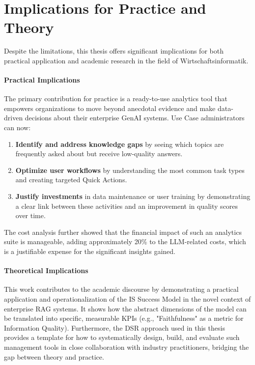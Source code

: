 \documentclass[
	english,
	ruledheaders=section,%
	class=report,%
	thesis={type=bachelor},%
	accentcolor=1b,%
	custommargins=true,%
	marginpar=false,%
	parskip=half-,%
	fontsize=11pt,%
	DIV=14,
]{tudapub}
\begin{document}
\section{Implications for Practice and Theory}
Despite the limitations, this thesis offers significant implications for both practical application and academic research in the field of Wirtschaftsinformatik.

\paragraph{Practical Implications} The primary contribution for practice is a ready-to-use analytics tool that empowers organizations to move beyond anecdotal evidence and make data-driven decisions about their enterprise GenAI systems. Use Case administrators can now:
\begin{enumerate}
    \item \textbf{Identify and address knowledge gaps} by seeing which topics are frequently asked about but receive low-quality answers.
    \item \textbf{Optimize user workflows} by understanding the most common task types and creating targeted Quick Actions.
    \item \textbf{Justify investments} in data maintenance or user training by demonstrating a clear link between these activities and an improvement in quality scores over time.
\end{enumerate}
The cost analysis further showed that the financial impact of such an analytics suite is manageable, adding approximately 20\% to the LLM-related costs, which is a justifiable expense for the significant insights gained.

\paragraph{Theoretical Implications} This work contributes to the academic discourse by demonstrating a practical application and operationalization of the IS Success Model in the novel context of enterprise RAG systems. It shows how the abstract dimensions of the model can be translated into specific, measurable KPIs (e.g., "Faithfulness" as a metric for Information Quality). Furthermore, the DSR approach used in this thesis provides a template for how to systematically design, build, and evaluate such management tools in close collaboration with industry practitioners, bridging the gap between theory and practice.
\end{document}

